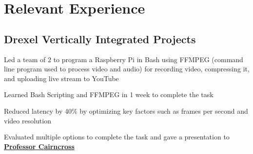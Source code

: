 \documentclass[]{deedy-resume-openfont}
\begin{document}
\begin{minipage}[t]{0.66\textwidth}


    \section{Relevant Experience}

    \subsection{Drexel Vertically Integrated Projects}
    \vspace{\topsep} %
    \begin{tightemize}
        \item Led a team of 2 to program a Raspberry Pi in Bash using FFMPEG (command line program used to process video and audio) for recording video, compressing it, and uploading live stream to YouTube
        \item Learned Bash Scripting and FFMPEG in 1 week to complete the task
        \item Reduced latency by 40\% by optimizing key factors such as frames per second and video resolution
        \item Evaluated multiple options to complete the task and gave a presentation to \textbf{\href{https://drexel.edu/engineering/about/faculty-staff/C/cairncross-richard/}{Professor Cairncross}}
    \end{tightemize}
    \sectionsep



\end{minipage}
\end{document}
